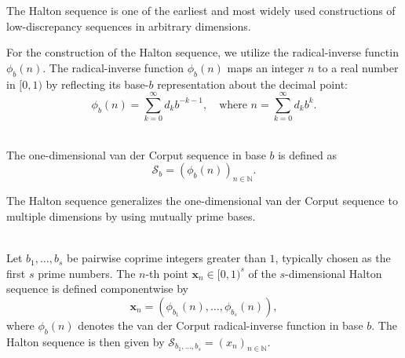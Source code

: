 The Halton sequence is one of the earliest and most widely used constructions of
low-discrepancy sequences in arbitrary dimensions. 

For the construction of the Halton sequence, we utilize the radical-inverse
functin $\phi_b(n)$. The radical-inverse function $\phi_b(n)$ maps an integer
$n$ to a real number in $[0,1)$ by reflecting its base-$b$ representation about
the decimal point:
\begin{equation*}
    \phi_b(n) = \sum_{k=0}^\infty d_k b^{-k-1}, \quad \text{where } n = \sum_
    {k=0}^\infty d_k b^k.
\end{equation*}

\begin{definition} \ \\
\label{def:van-der-corput-sequence}
The one-dimensional van der Corput sequence in base $b$ is defined as
\begin{equation*}
    \mathcal{S}_b = \left( \phi_b(n) \right)_{n\in \mathbb{N}}.
\end{equation*}
\end{definition}

The Halton sequence generalizes the one-dimensional van der Corput sequence to
multiple dimensions by using mutually prime bases.

\begin{definition} \ \\
Let $b_1, \dots, b_s$ be pairwise coprime integers greater than $1$, typically
chosen as the first $s$ prime numbers. The $n$-th point $\boldsymbol{x}_n \in
[0,1)^s$ of the $s$-dimensional Halton sequence is defined componentwise by
\begin{equation*}
    \boldsymbol{x}_n = \left( \phi_{b_1}(n), \dots, \phi_{b_s}(n) \right),
\end{equation*}
where $\phi_b(n)$ denotes the van der Corput radical-inverse function in base
$b$. The Halton sequence is then given by $\mathcal{S}_{b_1, \dots, b_s} = (x_n)_{n\in \mathbb{N}}$.
\end{definition}

